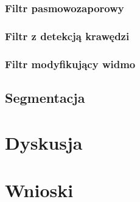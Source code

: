 \documentclass{classrep}
\begin{document}
\subsubsection{Filtr pasmowozaporowy}

\subsubsection{Filtr z detekcją krawędzi}

\subsubsection{Filtr modyfikujący widmo}


\subsection{Segmentacja}



\section{Dyskusja}



\section{Wnioski}


\begin{thebibliography}{8}

\end{thebibliography}
\end{document}

